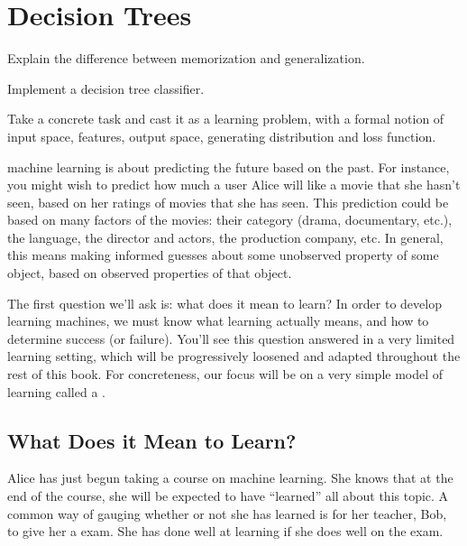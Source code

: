 \chapter{Decision Trees} \label{sec:dt}




\begin{learningobjectives}
\item Explain the difference between memorization and generalization.
\item Implement a decision tree classifier.
\item Take a concrete task and cast it as a learning problem, with a
  formal notion of input space, features, output space, generating
  distribution and loss function.
\end{learningobjectives}


 machine learning is about predicting
the future based on the past.  For instance, you might wish to predict
how much a user Alice will like a movie that she hasn't seen, based on
her ratings of movies that she has seen. This prediction could be based
on many factors of the movies: their category (drama, documentary, etc.),
the language, the director and actors, the production company, etc.
In general, this means making informed
guesses about some unobserved property of some object, based on
observed properties of that object.

The first question we'll ask is: what does it mean to learn?  In order
to develop learning machines, we must know what learning actually
means, and how to determine success (or failure).  You'll see this
question answered in a very limited learning setting, which will be
progressively loosened and adapted throughout the rest of this book.
For concreteness, our focus will be on a very simple model of learning
called a .

\section{What Does it Mean to Learn?}

Alice has just begun taking a course on machine learning.  She knows
that at the end of the course, she will be expected to have ``learned''
all about this topic.  A common way of gauging whether or not she has
learned is for her teacher, Bob, to give her a exam.  She has done
well at learning if she does well on the exam.


